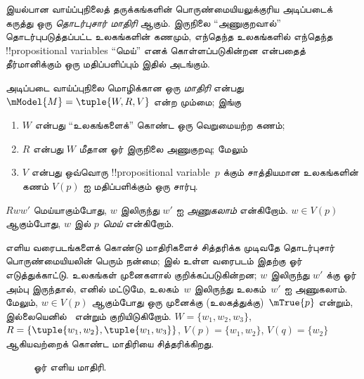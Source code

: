 \documentclass[../../../include/open-logic-section]{subfiles}
\begin{document}


இயல்பான வாய்ப்புநிலைத் தருக்கங்களின் பொருண்மையியலுக்குரிய அடிப்படைக்
கருத்து ஒரு \emph{தொடர்புசார் மாதிரி} ஆகும். இருநிலை ``அணுகுறவால்''
தொடர்புபடுத்தப்பட்ட உலகங்களின் கணமும், எந்தெந்த உலகங்களில் எந்தெந்த
!!{propositional variable}s ``மெய்'' எனக் கொள்ளப்படுகின்றன என்பதைத்
தீர்மானிக்கும் ஒரு மதிப்பளிப்பும் இதில் அடங்கும்.

\begin{defn}
  அடிப்படை வாய்ப்புநிலை மொழிக்கான ஒரு \emph{மாதிரி} என்பது $\mModel{M}
  = \tuple{W, R, V}$ என்ற மும்மை; இங்கு
  \begin{enumerate}
  \item $W$ என்பது ``உலகங்களைக்'' கொண்ட ஒரு வெறுமையற்ற கணம்;
  \item $R$ என்பது $W$ மீதான ஓர் இருநிலை அணுகுறவு; மேலும்
  \item $V$ என்பது ஒவ்வொரு !!{propositional variable}~$p$ க்கும்
    சாத்தியமான உலகங்களின் கணம் $V(p)$ ஐ மதிப்பளிக்கும் ஒரு சார்பு.
  \end{enumerate}
  $Rww'$ மெய்யாகும்போது, $w$ இலிருந்து $w'$ ஐ \emph{அணுகலாம்} என்கிறோம்.
  $w \in V(p)$ ஆகும்போது, $w$ இல் $p$ \emph{மெய்} என்கிறோம்.
\end{defn}

எளிய வரைபடங்களைக் கொண்டு மாதிரிகளைச் சித்தரிக்க முடிவதே தொடர்புசார்
பொருண்மையியலின் பெரும் நன்மை;  இல் உள்ள வரைபடம் இதற்கு
ஓர் எடுத்துக்காட்டு. உலகங்கள் முனைகளால் குறிக்கப்படுகின்றன; $w$ இலிருந்து
$w'$ க்கு ஓர் அம்பு இருந்தால், எனில் மட்டுமே, உலகம்~$w$ இலிருந்து
உலகம்~$w'$ ஐ அணுகலாம். மேலும், $w \in V(p)$ ஆகும்போது ஒரு முனைக்கு
(உலகத்துக்கு)~$\mTrue{p}$ என்றும், இல்லையெனில்~ என்றும்
குறியிடுகிறோம். $W = \{w_1, w_2, w_3\}$, $R = \{\tuple{w_1,
  w_2},\tuple{w_1, w_3}\}$, $V(p) = \{w_1, w_2\}$, $V(q) = \{w_2\}$
ஆகியவற்றைக் கொண்ட மாதிரியை  சித்தரிக்கிறது.

\begin{figure}
  \begin{center}
  \end{center}
  \caption{ஓர் எளிய மாதிரி.}
\end{figure}
\end{document}

